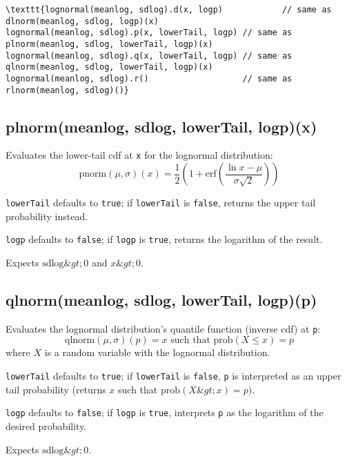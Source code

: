 \documentclass{article}
\begin{document}
\begin{lstlisting}
\texttt{lognormal(meanlog, sdlog).d(x, logp)            // same as dlnorm(meanlog, sdlog, logp)(x)
lognormal(meanlog, sdlog).p(x, lowerTail, logp) // same as plnorm(meanlog, sdlog, lowerTail, logp)(x)
lognormal(meanlog, sdlog).q(x, lowerTail, logp) // same as qlnorm(meanlog, sdlog, lowerTail, logp)(x)
lognormal(meanlog, sdlog).r()                   // same as rlnorm(meanlog, sdlog)()}\end{lstlisting}

    \subsection*{plnorm(meanlog, sdlog, lowerTail, logp)(x)}
    Evaluates the lower-tail cdf at \texttt{x} for the lognormal distribution:
$$\textrm{pnorm}(\mu, \sigma)(x) = \frac{1}{2}\left(1 + \textrm{erf}\left(\frac{\ln x - \mu}{\sigma\sqrt{2}}\right)\right)$$


\texttt{lowerTail} defaults to \texttt{true}; if \texttt{lowerTail} is \texttt{false}, returns
the upper tail probability instead.


\texttt{logp} defaults to \texttt{false}; if \texttt{logp} is \texttt{true}, returns the logarithm
of the result.


Expects $\textrm{sdlog} \&gt; 0$ and $x \&gt; 0$.


    \subsection*{qlnorm(meanlog, sdlog, lowerTail, logp)(p)}
    Evaluates the lognormal distribution's quantile function (inverse cdf) at \texttt{p}:
$$\textrm{qlnorm}(\mu, \sigma)(p) = x \textrm{ such that } \textrm{prob}(X \leq x) = p$$
where $X$ is a random variable with the lognormal distribution.


\texttt{lowerTail} defaults to \texttt{true}; if \texttt{lowerTail} is \texttt{false}, \texttt{p} is
interpreted as an upper tail probability (returns
$x$ such that $\textrm{prob}(X \&gt; x) = p)$.


\texttt{logp} defaults to \texttt{false}; if \texttt{logp} is \texttt{true}, interprets \texttt{p} as
the logarithm of the desired probability.


Expects $\textrm{sdlog} \&gt; 0$.
\end{document}
